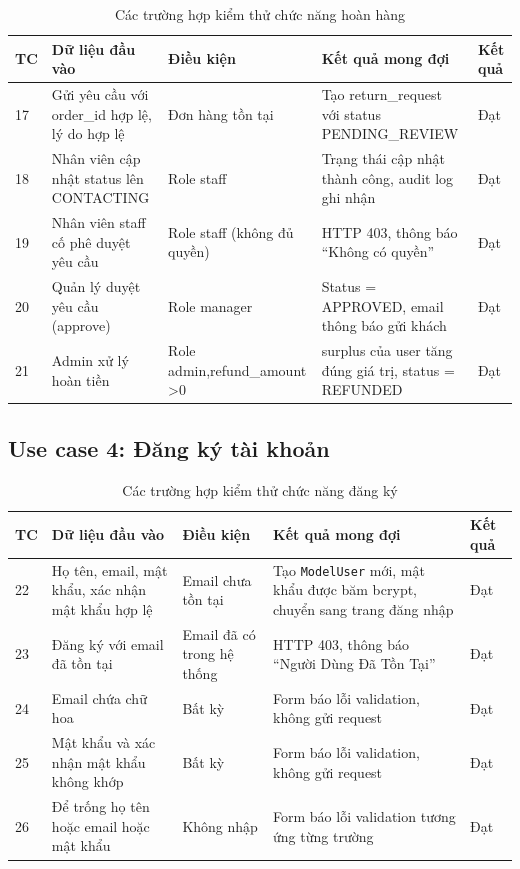 \documentclass[../DoAn.tex]{subfiles}
\begin{document}
\begin{table}[H]
\centering
\caption{Các trường hợp kiểm thử chức năng hoàn hàng}
\label{tab:test-return}
\scriptsize
\begin{tabular}{|p{0.5cm}|p{3.5cm}|p{3cm}|p{3.5cm}|p{2cm}|}
\hline
\textbf{TC} & \textbf{Dữ liệu đầu vào} & \textbf{Điều kiện} & \textbf{Kết quả mong đợi} & \textbf{Kết quả} \\
\hline
17 & Gửi yêu cầu với order\_id hợp lệ, lý do hợp lệ & Đơn hàng tồn tại & Tạo return\_request với status PENDING\_REVIEW & Đạt \\
\hline
18 & Nhân viên cập nhật status lên CONTACTING & Role staff & Trạng thái cập nhật thành công, audit log ghi nhận & Đạt \\
\hline
19 & Nhân viên staff cố phê duyệt yêu cầu & Role staff (không đủ quyền) & HTTP 403, thông báo ``Không có quyền'' & Đạt \\
\hline
20 & Quản lý duyệt yêu cầu (approve) & Role manager & Status = APPROVED, email thông báo gửi khách & Đạt \\
\hline
21 & Admin xử lý hoàn tiền & Role admin,\break refund\_amount >0 & surplus của user tăng đúng giá trị, status = REFUNDED & Đạt \\
\hline
\end{tabular}
\end{table}

\subsection*{Use case 4: Đăng ký tài khoản}

\begin{table}[H]
\centering
\caption{Các trường hợp kiểm thử chức năng đăng ký}
\label{tab:test-register}
\scriptsize
\begin{tabular}{|p{0.5cm}|p{3.5cm}|p{3cm}|p{3.5cm}|p{2cm}|}
\hline
\textbf{TC} & \textbf{Dữ liệu đầu vào} & \textbf{Điều kiện} & \textbf{Kết quả mong đợi} & \textbf{Kết quả} \\
\hline
22 & Họ tên, email, mật khẩu, xác nhận mật khẩu hợp lệ & Email chưa tồn tại & Tạo \texttt{ModelUser} mới, mật khẩu được băm bcrypt, chuyển sang trang đăng nhập & Đạt \\
\hline
23 & Đăng ký với email đã tồn tại & Email đã có trong hệ thống & HTTP 403, thông báo ``Người Dùng Đã Tồn Tại'' & Đạt \\
\hline
24 & Email chứa chữ hoa & Bất kỳ & Form báo lỗi validation, không gửi request & Đạt \\
\hline
25 & Mật khẩu và xác nhận mật khẩu không khớp & Bất kỳ & Form báo lỗi validation, không gửi request & Đạt \\
\hline
26 & Để trống họ tên hoặc email hoặc mật khẩu & Không nhập & Form báo lỗi validation tương ứng từng trường & Đạt \\
\hline
\end{tabular}
\end{table}
\end{document}
